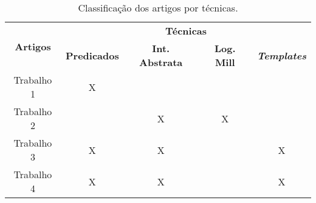 \begin{table}[htbp]
  \centering  
  \caption{Classificação dos artigos por técnicas.}
  \begin{tabular}{|c|c|c|c|c|}
    \hline
    \multicolumn{1}{|c|}{\multirow{2}{*}{\textbf{Artigos}}} & 
    \multicolumn{4}{c|}{\textbf{Técnicas}} \bigstrut\\
    \cline{2-5} &
    \textbf{Predicados} & \textbf{Int. Abstrata} & \textbf{Log. Mill} & \textbf{\textit{Templates}} \bigstrut\\
    \hline
    Trabalho 1 & X &  &  &  \bigstrut\\
    \hline
    Trabalho 2 &  & X & X &  \bigstrut\\
    \hline
    Trabalho 3 & X & X &  & X \bigstrut\\
    \hline
    Trabalho 4 & X & X &  & X \bigstrut\\
    \hline
  \end{tabular}
  \label{Table:TechByPapers}
\end{table}%


		